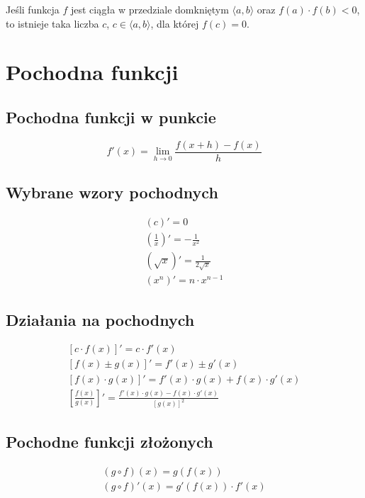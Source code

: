 \begin{theorem}
  Jeśli funkcja $f$ jest ciągła w przedziale domkniętym $\langle a, b\rangle$ oraz $f(a) \cdot f(b) < 0$,
  to istnieje taka liczba $c$, $c \in \langle a, b\rangle$, dla której $f(c) = 0$.
\end{theorem}

\section{Pochodna funkcji}
\subsection{Pochodna funkcji w punkcie}
\begin{equation*}
  f'(x) = \lim_{h \to 0} \frac{f(x + h) - f(x)}{h}
\end{equation*}

\subsection{Wybrane wzory pochodnych}
\begin{gather*}
  (c)' = 0\\
  \left(\frac 1 x\right)' = -\frac{1}{x^2}\\
  \left(\sqrt x\right)' = \frac{1}{2 \sqrt x}\\
  \left(x^n\right)' = n \cdot x^{n-1}
\end{gather*}

\subsection{Działania na pochodnych}
\begin{gather*}
  \left[c \cdot f(x)\right]' = c \cdot f'(x)\\
  \left[f(x) \pm g(x)\right]' = f'(x) \pm g'(x)\\
  \left[f(x) \cdot g(x)\right]' = f'(x) \cdot g(x) + f(x) \cdot g'(x)\\
  \left[\frac{f(x)}{g(x)}\right]' = \frac{f'(x) \cdot g(x) - f(x) \cdot  g'(x)}{\left[g(x)\right]^2}
\end{gather*}

\subsection{Pochodne funkcji złożonych}
\begin{gather*}
  (g \circ f)(x) = g(f(x))\\
  (g \circ f)'(x) = g'(f(x)) \cdot f'(x)
\end{gather*}

